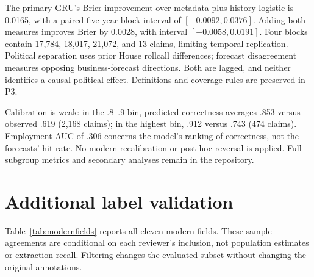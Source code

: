 \documentclass[iicol,pdflatex,sn-mathphys-num]{sn-jnl}
\begin{document}
The primary GRU's Brier improvement over metadata-plus-history logistic is 0.0165, with a paired five-year block interval of $[-0.0092,0.0376]$. Adding both measures improves Brier by 0.0028, with interval $[-0.0058,0.0191]$. Four blocks contain 17,784, 18,017, 21,072, and 13 claims, limiting temporal replication. Political separation uses prior House rollcall differences; forecast disagreement measures opposing business-forecast directions. Both are lagged, and neither identifies a causal political effect. Definitions and coverage rules are preserved in P3.

Calibration is weak: in the .8--.9 bin, predicted correctness averages .853 versus observed .619 (2,168 claims); in the highest bin, .912 versus .743 (474 claims). Employment AUC of .306 concerns the model's ranking of correctness, not the forecasts' hit rate. No modern recalibration or post hoc reversal is applied. Full subgroup metrics and secondary analyses remain in the repository.

\section{Additional label validation}\label{app:labels}
Table~\ref{tab:modernfields} reports all eleven modern fields. These sample agreements are conditional on each reviewer's inclusion, not population estimates or extraction recall. Filtering changes the evaluated subset without changing the original annotations.
\end{document}
